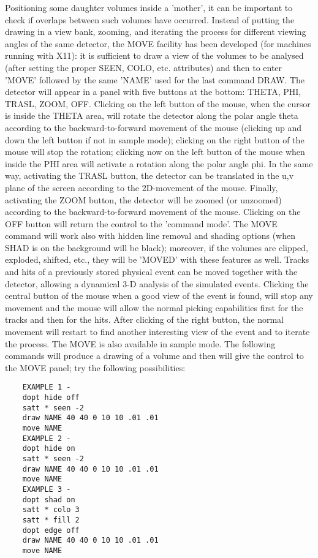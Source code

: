 \ENDCMD


\BEGARG
{}
\ENDARG

   \par
Positioning some daughter volumes inside a 'mother', it can be important to 
   check if overlaps between such volumes have occurred.  Instead of putting 
   the drawing in a view bank, zooming, and iterating the process for 
   different viewing angles of the same detector, the MOVE facility has been 
   developed (for machines running with X11):  it is sufficient to draw a view 
   of the volumes to be analysed (after setting the proper SEEN, COLO, etc. 
   attributes) and then to enter 'MOVE' followed by the same 'NAME' used for 
   the last command DRAW.  The detector will appear in a panel with five 
   buttons at the bottom: THETA, PHI, TRASL, ZOOM, OFF. Clicking on the left 
   button of the mouse, when the cursor is inside the THETA area, will rotate 
   the detector along the polar angle theta according to the 
   backward-to-forward movement of the mouse (clicking up and down the left 
   button if not in sample mode); clicking on the right button of the mouse 
   will stop the rotation; clicking now on the left button of the mouse when 
   inside the PHI area will activate a rotation along the polar angle phi. In 
   the same way, activating the TRASL button, the detector can be translated 
   in the u,v plane of the screen according to the 2D-movement of the mouse. 
   Finally, activating the ZOOM button, the detector will be zoomed (or 
   unzoomed) according to the backward-to-forward movement of the mouse. 
   Clicking on the OFF button will return the control to the 'command mode'. 
   The MOVE command will work also with hidden line removal and shading 
   options (when SHAD is on the background will be black); moreover, if the 
   volumes are clipped, exploded, shifted, etc., they will be 'MOVED' with 
   these features as well.  Tracks and hits of a previously stored physical 
   event can be moved together with the detector, allowing a dynamical 3-D 
   analysis of the simulated events. Clicking the central button of the mouse 
   when a good view of the event is found, will stop any movement and the 
   mouse will allow the normal picking capabilities first for the tracks and 
   then for the hits. After clicking of the right button, the normal movement 
   will restart to find another interesting view of the event and to iterate 
   the process.  The MOVE is also available in sample mode.  The following 
   commands will produce a drawing of a volume and then will give the control 
   to the MOVE panel; try the following possibilities:  
\begin{verbatim}
    EXAMPLE 1 -
    dopt hide off
    satt * seen -2
    draw NAME 40 40 0 10 10 .01 .01
    move NAME
    EXAMPLE 2 -
    dopt hide on
    satt * seen -2
    draw NAME 40 40 0 10 10 .01 .01
    move NAME
    EXAMPLE 3 -
    dopt shad on
    satt * colo 3
    satt * fill 2
    dopt edge off
    draw NAME 40 40 0 10 10 .01 .01
    move NAME
\end{verbatim}

